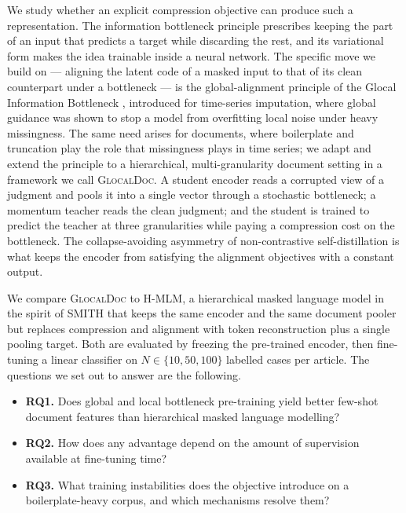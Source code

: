 \documentclass[conference]{IEEEtran}
\newcommand{\glocal}{\textsc{GlocalDoc}}
\newcommand{\hmlm}{\mbox{H-MLM}}
\begin{document}
We study whether an explicit compression objective can produce such a
representation. The information bottleneck principle \cite{tishby2000information}
prescribes keeping the part of an input that predicts a target while discarding the
rest, and its variational form \cite{alemi2017deep} makes the idea trainable inside
a neural network. The specific move we build on --- aligning the latent code of a
masked input to that of its clean counterpart under a bottleneck --- is the
global-alignment principle of the Glocal Information Bottleneck
\cite{yang2025glocal}, introduced for time-series imputation, where global guidance
was shown to stop a model from overfitting local noise under heavy missingness. The
same need arises for documents, where boilerplate and truncation play the role that
missingness plays in time series; we adapt and extend the principle to a
hierarchical, multi-granularity document setting in a framework we call \glocal{}. A
student encoder reads a corrupted view of a judgment and pools it into a single
vector through a stochastic bottleneck; a momentum teacher reads the clean judgment;
and the student is trained to predict the teacher at three granularities while
paying a compression cost on the bottleneck. The collapse-avoiding asymmetry of
non-contrastive self-distillation \cite{grill2020bootstrap,chen2021exploring} is
what keeps the encoder from satisfying the alignment objectives with a constant
output.

We compare \glocal{} to \hmlm{}, a hierarchical masked language model in the spirit
of SMITH \cite{yang2020beyond} that keeps the same encoder and the same document
pooler but replaces compression and alignment with token reconstruction plus a
single pooling target. Both are evaluated by freezing the pre-trained encoder, then
fine-tuning a linear classifier on $N \in \{10, 50, 100\}$ labelled cases per
article. The questions we set out to answer are the following.

\begin{itemize}
\item \textbf{RQ1.} Does global and local bottleneck pre-training yield better
few-shot document features than hierarchical masked language modelling?
\item \textbf{RQ2.} How does any advantage depend on the amount of supervision
available at fine-tuning time?
\item \textbf{RQ3.} What training instabilities does the objective introduce on a
boilerplate-heavy corpus, and which mechanisms resolve them?
\end{itemize}
\end{document}
